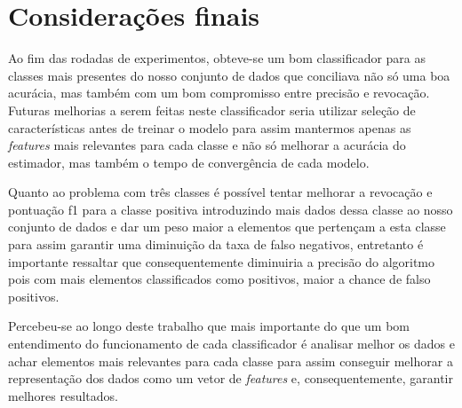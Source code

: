 \chapter{Considerações finais}

Ao fim das rodadas de experimentos, obteve-se um bom classificador
para as classes mais presentes do nosso conjunto de dados que conciliava
não só uma boa acurácia, mas também com um bom compromisso entre precisão e
revocação. Futuras melhorias a serem feitas neste classificador seria utilizar
seleção de características antes de treinar o modelo para assim mantermos apenas
as \textit{features} mais relevantes para cada classe e não só melhorar a acurácia
do estimador, mas também o tempo de convergência de cada modelo.

Quanto ao problema com três classes é possível tentar melhorar a revocação e pontuação
f1 para a classe positiva introduzindo mais dados dessa classe ao nosso conjunto de dados
e dar um peso maior a elementos que pertençam a esta classe para assim garantir uma diminuição
da taxa de falso negativos, entretanto é importante ressaltar que consequentemente diminuiria
a precisão do algoritmo pois com mais elementos classificados como positivos, maior a chance
de falso positivos.

Percebeu-se ao longo deste trabalho que mais importante do que um bom entendimento
do funcionamento de cada classificador é analisar melhor os dados e achar elementos
mais relevantes para cada classe para assim conseguir melhorar a representação dos dados
como um vetor de \textit{features} e, consequentemente, garantir melhores resultados.
